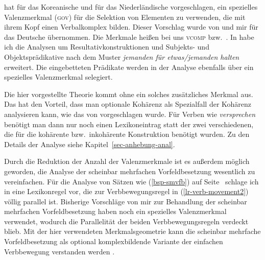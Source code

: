 \citet*{Chung93a} hat für das Koreanische
und \citet*{Rentier94} für das Niederländische vorgeschlagen,
ein spezielles Valenzmerkmal (\textsc{gov}) für die Selektion von Elementen zu verwenden,
die mit ihrem Kopf einen Verbalkomplex bilden. Dieser Vorschlag wurde
von \citet{Kathol98b,Kathol2000a} und mir \citep{Mueller97c,Mueller99a} für das Deutsche übernommen.
Die Merkmale heißen bei uns \textsc{vcomp} bzw.\ \xcomp.
In  habe ich die Analysen um Resultativkonstruktionen und Subjekts- und
Objektsprädikative nach dem Muster \emph{jemanden für etwas/jemanden halten} erweitert.
Die eingebetteten Prädikate werden in der Analyse ebenfalls über ein spezielles Valenzmerkmal selegiert.

Die hier vorgestellte Theorie kommt ohne ein solches zusätzliches Merkmal aus.
Das hat den Vorteil, dass man optionale Kohärenz als Spezialfall der Kohärenz analysieren
kann, wie das von \citet{Kiss95a} vorgeschlagen wurde. Für Verben wie \emph{versprechen}
benötigt man dann nur noch einen Lexikoneintrag statt der zwei verschiedenen, die für
die kohärente bzw.\ inkohärente Konstruktion benötigt wurden. Zu den Details der Analyse siehe
Kapitel~\ref{sec-anhebung-anal}.

Durch die Reduktion der Anzahl der Valenzmerkmale ist es außerdem möglich geworden,
die Analyse der scheinbar mehrfachen Vorfeldbesetzung wesentlich zu vereinfachen.
Für die Analyse von Sätzen wie (\ref{bsp-smvfb}) auf Seite~\pageref{bsp-smvfb} schlage ich in 
eine Lexikonregel vor, die zur Verbbewegungsregel in (\ref{lr-verb-movement2})
völlig parallel ist. Bisherige Vorschläge von mir zur Behandlung der 
scheinbar mehrfachen Vorfeldbesetzung \citep{Mueller2002f,Mueller2002c} haben
noch ein spezielles Valenzmerkmal verwendet, wodurch die Parallelität der beiden
Verbbewegungsregeln verdeckt blieb. Mit der hier verwendeten Merkmalsgeometrie kann
die scheinbar mehrfache Vorfeldbesetzung als optional komplexbildende Variante
der einfachen Verbbewegung verstanden werden \citep{Mueller2005d}.



